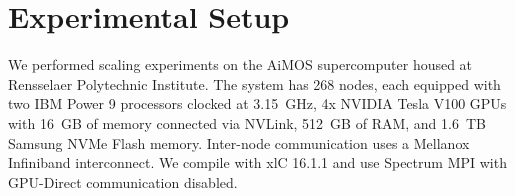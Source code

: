


\section{Experimental Setup}
We performed scaling experiments on the AiMOS supercomputer housed at Rensselaer Polytechnic Institute. The system has 268 nodes, each equipped with two IBM Power 9 processors clocked at 3.15~GHz, 4x NVIDIA Tesla V100 GPUs with 16~GB of memory connected via NVLink, 512~GB of RAM, and 1.6~TB Samsung NVMe Flash memory. Inter-node communication uses a Mellanox Infiniband interconnect. We compile with xlC 16.1.1 and use Spectrum MPI with GPU-Direct communication disabled.



